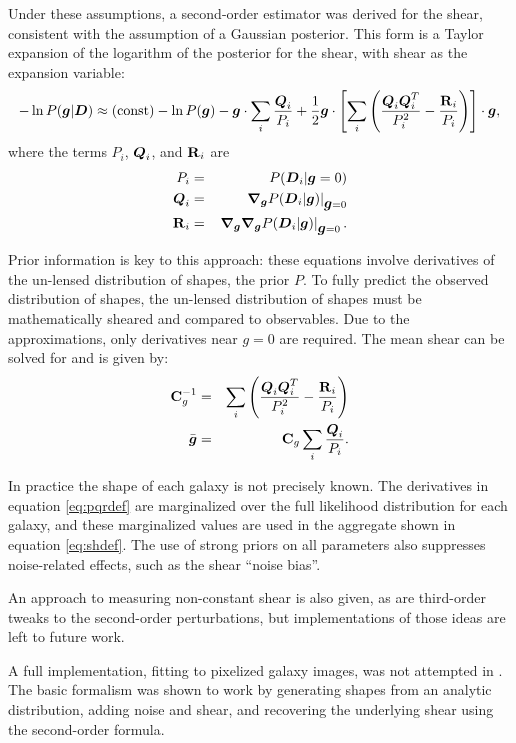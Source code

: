 \documentclass[12pt,preprint]{aastex}
\newcommand{\vecg}{\mbox{\boldmath $g$}}
\newcommand{\vecD}{\mbox{\boldmath $D$}}
\newcommand{\vecQ}{\mbox{\boldmath $Q$}}
\newcommand{\matR}{\mbox{$\bf R$}}
\newcommand{\matC}{\mbox{$\bf C$}}
\newcommand{\bnabg}{ \boldsymbol{\nabla_g}}
\begin{document}
Under these assumptions, a second-order estimator was derived for the shear,
consistent with the assumption of a Gaussian posterior.  This form is a Taylor
expansion of the logarithm of the posterior for the shear, with shear as the
expansion variable:
\begin{equation} \label{eq:pexpand}
-\ln P(\vecg | \vecD) \approx {(\rm const)} - \ln P(\vecg) - \vecg \cdot \sum_i
    \frac{\vecQ_i}{P_i}
    + \frac{1}{2} \vecg \cdot \left[ \sum_i \left(\frac{\vecQ_i \vecQ^T_i}{P_i^2}
    - \frac{\matR_i}{P_i}\right) \right] \cdot \vecg,
\end{equation}
where the terms $P_i$, $\vecQ_i$, and $\matR_i$ are 
\begin{eqnarray} \label{eq:pqrdef}
P_i     & = & P(\vecD_i | \vecg=0) \nonumber \\
\vecQ_i & = & \left. \bnabg P(\vecD_i | \vecg)\right|_{\vecg=0} \\
\matR_i & = & \left. \bnabg \bnabg P(\vecD_i | \vecg)\right|_{\vecg=0}. \nonumber
\end{eqnarray}

Prior information is key to this approach: these equations involve derivatives
of the un-lensed distribution of shapes, the prior $P$. To fully predict the
observed distribution of shapes, the un-lensed distribution of shapes must be
mathematically sheared and compared to observables.  Due to the approximations,
only derivatives near $g=0$ are required. The mean shear can be solved for and
is given by:
\begin{eqnarray} \label{eq:shdef}
\matC_g^{-1} & = & \sum_i \left(\frac{\vecQ_i \vecQ^T_i}{P_i^2} - \frac{\matR_i}{P_i}\right) \\
\bar{\vecg} & = &  \matC_g \sum_i \frac{\vecQ_i}{P_i}.
\end{eqnarray}

In practice the shape of each galaxy is not precisely known. The derivatives in
equation \ref{eq:pqrdef} are marginalized over the full likelihood distribution
for each galaxy, and these marginalized values are used in the aggregate shown
in equation \ref{eq:shdef}.  The use of strong priors on all parameters also
suppresses noise-related effects, such as the shear ``noise bias''.  

An approach to measuring non-constant shear is also given, as are third-order
tweaks to the second-order perturbations, but implementations of those ideas
are left to future work.

A full implementation, fitting to pixelized galaxy images, was not attempted in
\citet{ba13}.  The basic formalism was shown to work by generating shapes from
an analytic distribution, adding noise and shear, and recovering the underlying
shear using the second-order formula.
\end{document}
